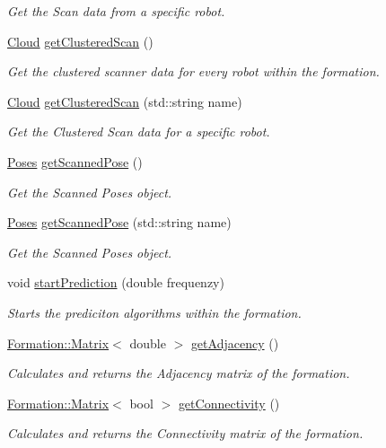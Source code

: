 \begin{DoxyCompactItemize}
\begin{DoxyCompactList}\small\item\em Get the Scan data from a specific robot. \end{DoxyCompactList}\item 
\hyperlink{classFormation_a35557939fd09f70d86432bfb68f315e2}{Cloud} \hyperlink{classFormation_a1335fe18a276370833fd44554b1bdcf5}{get\+Clustered\+Scan} ()
\begin{DoxyCompactList}\small\item\em Get the clustered scanner data for every robot within the formation. \end{DoxyCompactList}\item 
\hyperlink{classFormation_a35557939fd09f70d86432bfb68f315e2}{Cloud} \hyperlink{classFormation_a11b9cc80dc3eff6c83cfaf0147637891}{get\+Clustered\+Scan} (std\+::string name)
\begin{DoxyCompactList}\small\item\em Get the Clustered Scan data for a specific robot. \end{DoxyCompactList}\item 
\hyperlink{classFormation_ae679dc0b3c837ce510678f0fd98baf36}{Poses} \hyperlink{classFormation_af0ecd22c0998609569ad33c0f93de39e}{get\+Scanned\+Pose} ()
\begin{DoxyCompactList}\small\item\em Get the Scanned Poses object. \end{DoxyCompactList}\item 
\hyperlink{classFormation_ae679dc0b3c837ce510678f0fd98baf36}{Poses} \hyperlink{classFormation_a3cc2889276bd6847bd1bec115b6e58ac}{get\+Scanned\+Pose} (std\+::string name)
\begin{DoxyCompactList}\small\item\em Get the Scanned Poses object. \end{DoxyCompactList}\item 
void \hyperlink{classFormation_ab5ed22754d944ab340b1b41090239369}{start\+Prediction} (double frequenzy)
\begin{DoxyCompactList}\small\item\em Starts the prediciton algorithms within the formation. \end{DoxyCompactList}\item 
\hyperlink{classFormation_a227cd099c5171dd7a8f66cf010793e4e}{Formation\+::\+Matrix}$<$ double $>$ \hyperlink{classFormation_ac02154b202da99f2752c617cc2afc8b0}{get\+Adjacency} ()
\begin{DoxyCompactList}\small\item\em Calculates and returns the Adjacency matrix of the formation. \end{DoxyCompactList}\item 
\hyperlink{classFormation_a227cd099c5171dd7a8f66cf010793e4e}{Formation\+::\+Matrix}$<$ bool $>$ \hyperlink{classFormation_ae94d8ce0717f1f1288236f21b49b6df1}{get\+Connectivity} ()
\begin{DoxyCompactList}\small\item\em Calculates and returns the Connectivity matrix of the formation. \end{DoxyCompactList}\end{DoxyCompactItemize}
